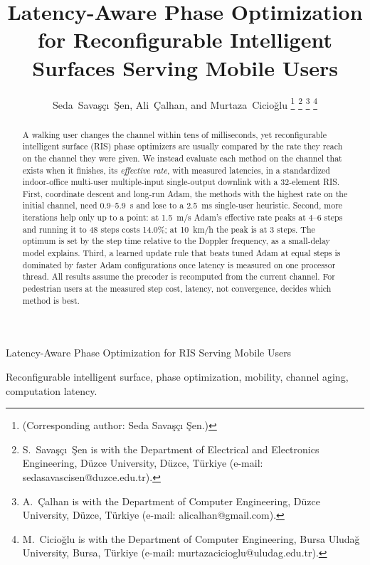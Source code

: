 \documentclass[journal]{IEEEtran}
\begin{document}
\title{Latency-Aware Phase Optimization for Reconfigurable Intelligent Surfaces Serving Mobile Users}

\author{Seda~Savaşçı~Şen, Ali~Çalhan, and Murtaza~Cicioğlu%
\thanks{(Corresponding author: Seda Savaşçı Şen.)}%
\thanks{S.~Savaşçı~Şen is with the Department of Electrical and Electronics Engineering, Düzce University, Düzce, Türkiye (e-mail: sedasavascisen@duzce.edu.tr).}%
\thanks{A.~Çalhan is with the Department of Computer Engineering, Düzce University, Düzce, Türkiye (e-mail: alicalhan@gmail.com).}%
\thanks{M.~Cicioğlu is with the Department of Computer Engineering, Bursa Uludağ University, Bursa, Türkiye (e-mail: murtazacicioglu@uludag.edu.tr).}}

%
{Latency-Aware Phase Optimization for RIS Serving Mobile Users}

\maketitle

\begin{abstract}
A walking user changes the channel within tens of milliseconds, yet reconfigurable intelligent surface (RIS) phase optimizers are usually compared by the rate they reach on the channel they were given. We instead evaluate each method on the channel that exists when it finishes, its \emph{effective rate}, with measured latencies, in a standardized indoor-office multi-user multiple-input single-output downlink with a 32-element RIS. First, coordinate descent and long-run Adam, the methods with the highest rate on the initial channel, need 0.9--5.9~s and lose to a 2.5~ms single-user heuristic. Second, more iterations help only up to a point: at 1.5~m/s Adam's effective rate peaks at 4--6 steps and running it to 48 steps costs 14.0\%; at 10~km/h the peak is at 3 steps. The optimum is set by the step time relative to the Doppler frequency, as a small-delay model explains. Third, a learned update rule that beats tuned Adam at equal steps is dominated by faster Adam configurations once latency is measured on one processor thread. All results assume the precoder is recomputed from the current channel. For pedestrian users at the measured step cost, latency, not convergence, decides which method is best.
\end{abstract}

\begin{IEEEkeywords}
Reconfigurable intelligent surface, phase optimization, mobility, channel aging, computation latency.
\end{IEEEkeywords}
\end{document}
